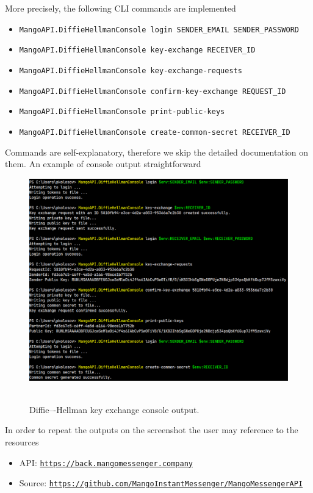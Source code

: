 \documentclass[12pt,letterpaper,oneside,reqno]{amsart}
\numberwithin{equation}{section}
\begin{document}
    More precisely, the following CLI commands are implemented
    \begin{itemize}
        \item \texttt{MangoAPI.DiffieHellmanConsole login SENDER\_EMAIL SENDER\_PASSWORD}
        \item \texttt{MangoAPI.DiffieHellmanConsole key-exchange RECEIVER\_ID}
        \item \texttt{MangoAPI.DiffieHellmanConsole key-exchange-requests}
        \item \texttt{MangoAPI.DiffieHellmanConsole confirm-key-exchange REQUEST\_ID}
        \item \texttt{MangoAPI.DiffieHellmanConsole print-public-keys}
        \item \texttt{MangoAPI.DiffieHellmanConsole create-common-secret RECEIVER\_ID}
    \end{itemize}
    Commands are self-explanatory, therefore we skip the detailed documentation on them.
    An example of console output straightforward
    \begin{figure}[H]
        \centering
        \includegraphics[width=1\textwidth]{Pictures/Diffie_Hellman_console_output}
        ~\caption{Diffie–-Hellman key exchange console output.}\label{fig:figure7}
    \end{figure}
    In order to repeat the outputs on the screenshot the user may reference to the resources
    \begin{itemize}
        \item API: \href{https://back.mangomessenger.company}{\texttt{https://back.mangomessenger.company}}
        \item Source: \href{https://github.com/MangoInstantMessenger/MangoMessengerAPI}{\texttt{https://github.com/MangoInstantMessenger/MangoMessengerAPI}}
    \end{itemize}
\end{document}
